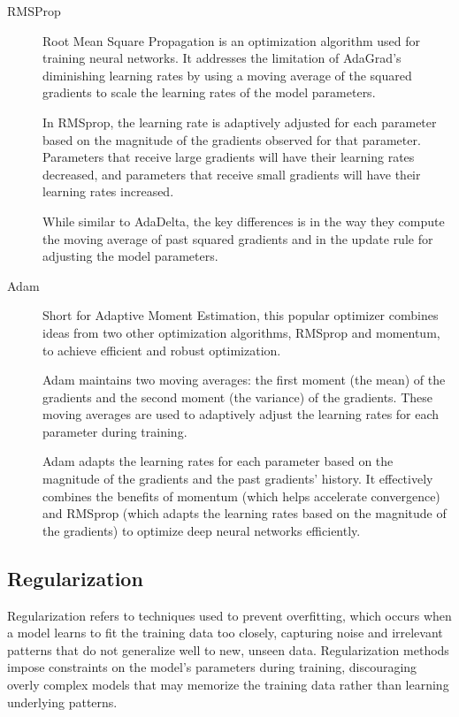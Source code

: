 \documentclass[a4paper]{article}
\begin{document}
\begin{description}
\item[RMSProp]
Root Mean Square Propagation is an optimization algorithm used for training neural networks. It addresses the limitation of AdaGrad's diminishing learning rates by using a moving average of the squared gradients to scale the learning rates of the model parameters.

In RMSprop, the learning rate is adaptively adjusted for each parameter based on the magnitude of the gradients observed for that parameter. Parameters that receive large gradients will have their learning rates decreased, and parameters that receive small gradients will have their learning rates increased.

While similar to AdaDelta, the key differences is in the way they compute the moving average of past squared gradients and in the update rule for adjusting the model parameters.

\item[Adam]
Short for Adaptive Moment Estimation, this popular optimizer combines ideas from two other optimization algorithms, RMSprop and momentum, to achieve efficient and robust optimization.

Adam maintains two moving averages: the first moment (the mean) of the gradients and the second moment (the variance) of the gradients. These moving averages are used to adaptively adjust the learning rates for each parameter during training.

Adam adapts the learning rates for each parameter based on the magnitude of the gradients and the past gradients' history. It effectively combines the benefits of momentum (which helps accelerate convergence) and RMSprop (which adapts the learning rates based on the magnitude of the gradients) to optimize deep neural networks efficiently.

\end{description}

\subsection*{Regularization}
Regularization refers to techniques used to prevent overfitting, which occurs when a model learns to fit the training data too closely, capturing noise and irrelevant patterns that do not generalize well to new, unseen data. Regularization methods impose constraints on the model's parameters during training, discouraging overly complex models that may memorize the training data rather than learning underlying patterns.
\end{document}
